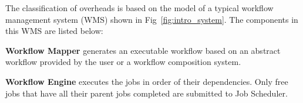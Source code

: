 






The classification of overheads is based on the model of a typical workflow management system (WMS) shown in Fig~\ref{fig:intro_system}. The components in this WMS are listed below: 


\textbf{Workflow Mapper} generates an executable workflow based on an abstract workflow provided by the user or a workflow composition system. 

\textbf{Workflow Engine} executes the jobs in order of their dependencies. Only free jobs that have all their parent jobs completed are submitted to  Job Scheduler. 

